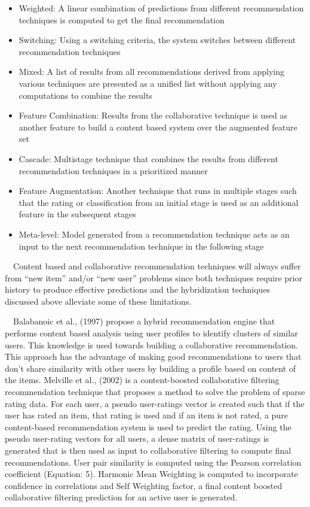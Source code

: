 \documentclass[12pt]{article}
\begin{document}
\begin{itemize}
\item Weighted: A linear combination of predictions from different recommendation techniques is computed to get the final recommendation
\item Switching: Using a switching criteria, the system switches between different recommendation techniques
\item Mixed: A list of results from all recommendations derived from applying various techniques are presented as a unified list without applying any computations to combine the results
\item Feature Combination: Results from the collaborative technique is used as another feature to build a content based system over the augmented feature set
\item Cascade: Multistage technique that combines the results from different recommendation techniques in a prioritized manner 
\item Feature Augmentation: Another technique that runs in multiple stages such that the rating or classification from an initial stage is used as an additional feature in the subsequent stages
\item Meta-level: Model generated from a recommendation technique acts as an input to the next recommendation technique in the following stage
\end{itemize}
\ \ Content based and collaborative recommendation techniques will always suffer from ``new item'' and/or ``new user'' problems since both techniques require prior history to produce effective predictions and the hybridization techniques discussed above alleviate some of these limitations. 

\ \ Balabanoic et al., (1997) \cite{balabanovic} propose a hybrid recommendation engine that performs content based analysis using user profiles to identify clusters of similar users. This knowledge is used towards building a collaborative recommendation. This approach has the advantage of making good recommendations to users that don't share similarity with other users by building a profile based on content of the items. Melville et al., (2002) \cite{melville} is a content-boosted collaborative filtering recommendation technique that proposes a method to solve the problem of sparse rating data. For each user, a pseudo user-ratings vector is created such that if the user has rated an item, that rating is used and if an item is not rated, a pure content-based recommendation system is used to predict the rating. Using the pseudo user-rating vectors for all users, a dense matrix of user-ratings is generated that is then used as input to collaborative filtering to compute final recommendations. User pair similarity is computed using the Pearson correlation coefficient (Equation: 5).  Harmonic Mean Weighting is computed to incorporate confidence in correlations and Self Weighting factor, a final content boosted collaborative filtering prediction for an active user is generated. 
\end{document}
